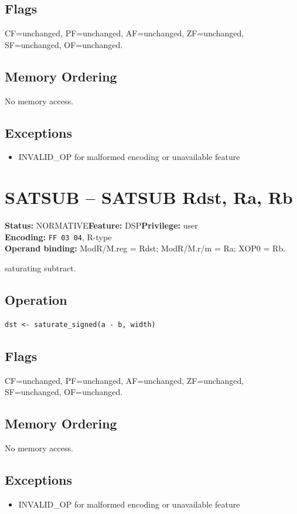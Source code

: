 \documentclass[10pt]{article}
\begin{document}
\subsection*{Flags}
CF=unchanged, PF=unchanged, AF=unchanged, ZF=unchanged, SF=unchanged, OF=unchanged.
\subsection*{Memory Ordering}
No memory access.
\subsection*{Exceptions}
\begin{itemize}
\item INVALID\_OP for malformed encoding or unavailable feature
\end{itemize}
\clearpage

\section{SATSUB -- SATSUB Rdst, Ra, Rb}
\textbf{Status:} NORMATIVE\quad \textbf{Feature:} DSP\quad \textbf{Privilege:} user\\
\textbf{Encoding:} \texttt{FF 03 04}, R-type\\
\textbf{Operand binding:} ModR/M.reg = Rdst; ModR/M.r/m = Ra; XOP0 = Rb.

saturating subtract.

\subsection*{Operation}
\begin{lstlisting}
dst <- saturate_signed(a - b, width)
\end{lstlisting}
\subsection*{Flags}
CF=unchanged, PF=unchanged, AF=unchanged, ZF=unchanged, SF=unchanged, OF=unchanged.
\subsection*{Memory Ordering}
No memory access.
\subsection*{Exceptions}
\begin{itemize}
\item INVALID\_OP for malformed encoding or unavailable feature
\end{itemize}
\clearpage
\end{document}
